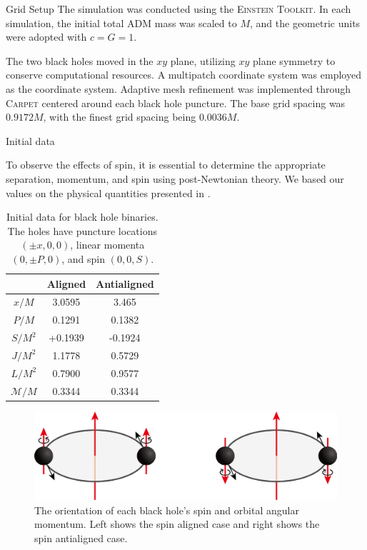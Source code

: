 \documentclass[noamssymb]{beamer}
\newlength{\colwidth}
\begin{document}
\begin{frame}[t]
\begin{columns}[t]
\begin{column}{\colwidth}
\begin{block}{Grid Setup}
  	The simulation was conducted using the \textsc{Einstein Toolkit}\cite{EinsteinToolkit:2023_05}. In each simulation, the initial total ADM mass was scaled to $M$, and the geometric units were adopted with $c=G=1$.
  	
  	The two black holes moved in the $xy$ plane, utilizing $xy$ plane symmetry to conserve computational resources. A multipatch coordinate system\cite{Pollney:2009yz} was employed as the coordinate system. Adaptive mesh refinement was implemented through \textsc{Carpet}\cite{CarpetCode:web} centered around each black hole puncture. The base grid spacing was $0.9172M$, with the finest grid spacing being $0.0036M$.
  	
  \end{block}
  
  \begin{block}{Initial data}
  	
  	To observe the effects of spin, it is essential to determine the appropriate separation, momentum, and spin using post-Newtonian theory. We based our values on the physical quantities presented in \cite{Campanelli:2006uy}. 
  	
  	\begin{table}
  		\centering
  		\begin{tabular}{c c c}
  			\toprule
  			\textbf{} & \textbf{Aligned} & \textbf{Antialigned}\\
  			\midrule
  			$x/M$ & 3.0595 & 3.465 \\
  			$P/M$ & 0.1291 & 0.1382 \\
  			$S/M^2$ & +0.1939 & -0.1924 \\
  			$J/M^2$ & 1.1778 & 0.5729 \\
  			$L/M^2$ & 0.7900 & 0.9577 \\
  			$\mathcal{M}/M$ & 0.3344 & 0.3344\\
  			\bottomrule
  		\end{tabular}
  		\caption{Initial data for black hole binaries. The holes have puncture locations $(\pm x, 0, 0)$, linear momenta $(0, \pm P, 0)$, and spin $(0, 0, S)$.}
  	\end{table}
  	
  	\begin{figure}
  		\centering
  		\includegraphics[width=0.8\columnwidth]{img/intro}
  		\caption{\label{fig:intro}The orientation of each black hole's spin and orbital angular momentum. Left shows the spin aligned case and right shows the spin antialigned case.}
  	\end{figure}
  	

\end{block}
\end{column}
\end{columns}
\end{frame}
\end{document}
